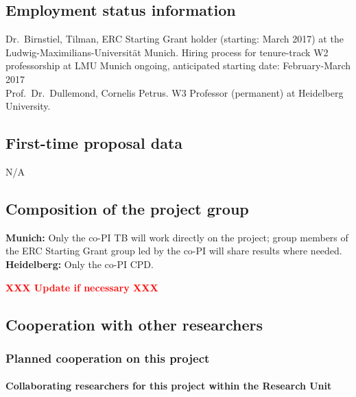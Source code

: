 \documentclass[10pt,fleqn,twoside]{article}
\newcommand{\missing}[1]{\textcolor{red}{\textbf{XXX #1 XXX}}}
\begin{document}
\subsection{Employment status information}


Dr.~Birnstiel, Tilman, ERC Starting Grant holder (starting: March 2017) at
the Ludwig-Maximilians-Universit\"at Munich. Hiring process for tenure-track W2
professorship at LMU Munich ongoing, anticipated starting date: February-March
2017\\
Prof.~Dr.~Dullemond, Cornelis Petrus.
W3 Professor (permanent) at Heidelberg University.


\subsection{First-time proposal data}

N/A

\subsection{Composition of the project group}
\textbf{Munich:} Only the co-PI TB will work directly on the project; group
members of the ERC Starting Grant group led by the co-PI will share results where
needed.\\
\textbf{Heidelberg:} Only the co-PI CPD.

\missing{Update if necessary}

\subsection{Cooperation with other researchers}

\subsubsection{Planned cooperation on this project}

\paragraph{\Tcol Collaborating researchers for this project within the
  Research Unit}
\end{document}

